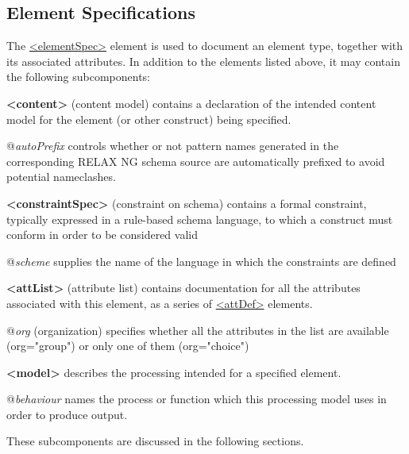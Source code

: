\subsection[{Element Specifications}]{Element Specifications}\label{TDTAG}\par
The \hyperref[TEI.elementSpec]{<elementSpec>} element is used to document an element type, together with its associated attributes. In addition to the elements listed above, it may contain the following subcomponents: 
\begin{sansreflist}
  
\item [\textbf{<content>}] (content model) contains a declaration of the intended content model for the element (or other construct) being specified.\hfil\\[-10pt]\begin{sansreflist}
    \item[@{\itshape autoPrefix}]
  controls whether or not pattern names generated in the corresponding RELAX NG schema source are automatically prefixed to avoid potential nameclashes.
\end{sansreflist}  
\item [\textbf{<constraintSpec>}] (constraint on schema) contains a formal constraint, typically expressed in a rule-based schema language, to which a construct must conform in order to be considered valid\hfil\\[-10pt]\begin{sansreflist}
    \item[@{\itshape scheme}]
  supplies the name of the language in which the constraints are defined
\end{sansreflist}  
\item [\textbf{<attList>}] (attribute list) contains documentation for all the attributes associated with this element, as a series of \hyperref[TEI.attDef]{<attDef>} elements.\hfil\\[-10pt]\begin{sansreflist}
    \item[@{\itshape org}]
  (organization) specifies whether all the attributes in the list are available (org="group") or only one of them (org="choice")
\end{sansreflist}  
\item [\textbf{<model>}] describes the processing intended for a specified element.\hfil\\[-10pt]\begin{sansreflist}
    \item[@{\itshape behaviour}]
  names the process or function which this processing model uses in order to produce output.
\end{sansreflist}  
\end{sansreflist}
\par
These subcomponents are discussed in the following sections.
